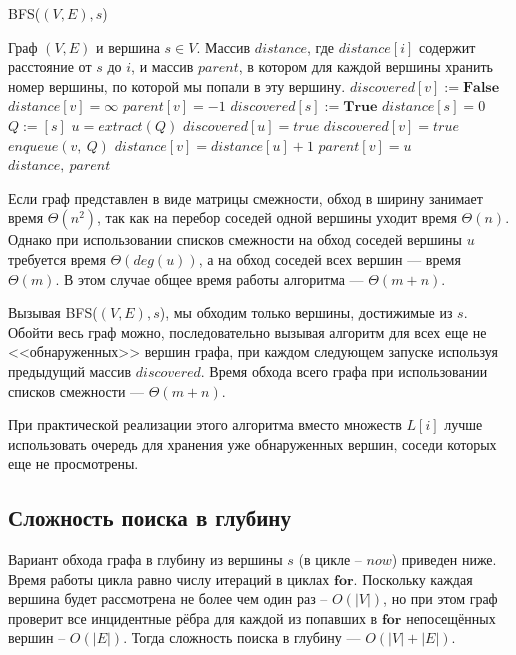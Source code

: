 \documentclass[a4paper,12pt]{article}
\newcommand{\algname}[1]{\textsc{#1}}
\begin{document}
\begin{algorithm}
  	\caption{\algname{BFS}($(V, E), s$)}
    \begin{algorithmic}
		\Require Граф $(V, E)$ и вершина $s \in V$.
		\Ensure Массив $distance$, где $distance[i]$ содержит расстояние от $s$ до $i$, и массив $parent$, в котором для каждой вершины хранить номер вершины, по которой мы попали в эту вершину.
			\State $discovered[v] := \textbf{False}$
			\State $distance[v] = \infty$
			\State $parent[v] = -1$
		\EndFor
		\State $discovered[s] := \textbf{True}$
		\State $distance[s] = 0$
        \State $Q := [s]$
            \State $u = extract(Q)$
            \State $discovered[u] = true$
                    \State $discovered[v] = true$
                    \State $enqueue(v,\ Q)$
                    \State $distance[v] = distance[u] + 1$
                    \State $parent[v] = u$
                \EndIf
            \EndFor
        \EndWhile
		\State
		\Return $distance,\ parent$
	\end{algorithmic}
\end{algorithm}

Если граф представлен в виде матрицы смежности, обход в ширину занимает время $\Theta(n^2)$, так как на перебор соседей одной вершины уходит время $\Theta(n)$. Однако при использовании списков смежности на обход соседей вершины $u$ требуется время $\Theta(deg(u))$, а на обход соседей всех вершин --- время $\Theta(m)$. В этом случае общее время работы алгоритма --- $\Theta(m + n)$. 


Вызывая \algname{BFS}($(V, E), s$), мы обходим только вершины, достижимые из $s$. Обойти весь граф можно, последовательно вызывая алгоритм для всех еще не <<обнаруженных>> вершин графа, при каждом следующем запуске используя предыдущий массив $discovered$. Время обхода всего графа при использовании списков смежности --- $\Theta(m + n)$.

При практической реализации этого алгоритма вместо множеств $L[i]$ лучше использовать очередь для хранения уже обнаруженных вершин, соседи которых еще не просмотрены.

\subsection{Сложность поиска в глубину}
Вариант обхода графа в глубину из вершины $s$ (в цикле -- $now$) приведен ниже. Время работы цикла равно числу итераций в циклах $\textbf{for}$. Поскольку каждая вершина будет рассмотрена не более чем один раз -- $O(|V|)$, но при этом граф проверит все инцидентные рёбра для каждой из попавших в $\textbf{for}$ непосещённых вершин -- $O(|E|)$. Тогда сложность поиска в глубину --- $O(|V| + |E|)$.
\end{document}
